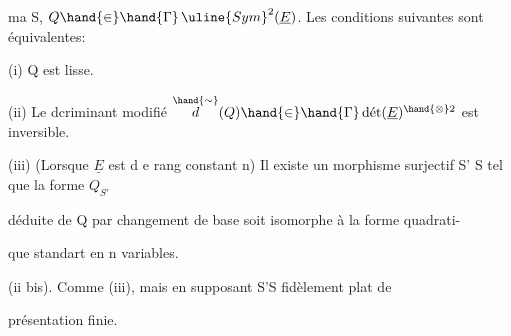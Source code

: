 ma S, $Q \hand{\in}\hand{\Gamma}\,\uline{Sym}^2(\underline{E})$. Les conditions suivantes sont équivalentes:

(i) Q est lisse.

(ii) Le dcriminant modifié $\overset{\hand{\sim}}{d}(Q) \hand{\in}\hand{\Gamma}\,\text{dét}(\underline{E})^{\hand{\otimes}2}$ est inversible.

(iii) (Lorsque $\underline{E}$ est d e rang constant n) Il existe un morphisme surjectif S' \quad S tel que la forme $Q_{S'}$

déduite de Q par changement de base soit isomorphe à la forme quadrati-%

que standart en n variables.

(ii bis). Comme (iii), mais en supposant S'\hand{$\rightarrow$}S fidèlement plat de

présentation finie.

